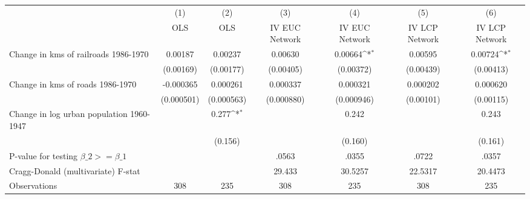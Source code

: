 {
\def\sym#1{\ifmmode^{#1}\else\(^{#1}\)\fi}
\begin{tabular}{l*{6}{c}}
\hline\hline
                &\multicolumn{1}{c}{(1)}&\multicolumn{1}{c}{(2)}&\multicolumn{1}{c}{(3)}&\multicolumn{1}{c}{(4)}&\multicolumn{1}{c}{(5)}&\multicolumn{1}{c}{(6)}\\
                &\multicolumn{1}{c}{OLS}&\multicolumn{1}{c}{OLS}&\multicolumn{1}{c}{IV EUC Network}&\multicolumn{1}{c}{IV EUC Network}&\multicolumn{1}{c}{IV LCP Network}&\multicolumn{1}{c}{IV LCP Network}\\
\hline
Change in kms of railroads 1986-1970&  0.00187         &  0.00237         &  0.00630         &  0.00664\sym{*}  &  0.00595         &  0.00724\sym{*}  \\
                &(0.00169)         &(0.00177)         &(0.00405)         &(0.00372)         &(0.00439)         &(0.00413)         \\
[1em]
Change in kms of roads 1986-1970&-0.000365         & 0.000261         & 0.000337         & 0.000321         & 0.000202         & 0.000620         \\
                &(0.000501)         &(0.000563)         &(0.000880)         &(0.000946)         &(0.00101)         &(0.00115)         \\
[1em]
Change in log urban population 1960-1947&                  &    0.277\sym{*}  &                  &    0.242         &                  &    0.243         \\
                &                  &  (0.156)         &                  &  (0.160)         &                  &  (0.161)         \\
\hline
P-value for testing $\beta\_{2} >= \beta\_{1}$&                  &                  &    .0563         &    .0355         &    .0722         &    .0357         \\
Cragg-Donald (multivariate) F-stat&                  &                  &   29.433         &  30.5257         &  22.5317         &  20.4473         \\
Observations    &      308         &      235         &      308         &      235         &      308         &      235         \\
\hline\hline
\end{tabular}
}
